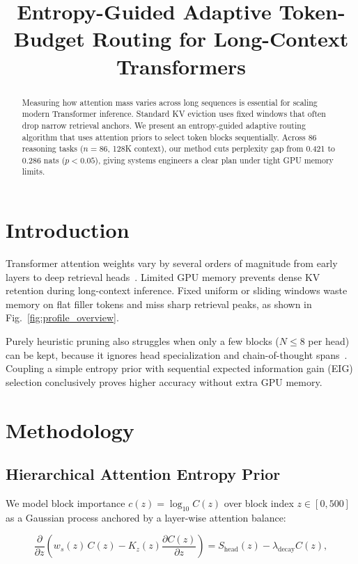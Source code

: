 \documentclass[11pt]{article}
\title{Entropy-Guided Adaptive Token-Budget Routing for Long-Context Transformers}
\begin{document}
\maketitle

\begin{abstract}
Measuring how attention mass varies across long sequences is essential for scaling modern Transformer inference. Standard KV eviction uses fixed windows that often drop narrow retrieval anchors. We present an entropy-guided adaptive routing algorithm that uses attention priors to select token blocks sequentially. Across 86 reasoning tasks ($n = 86$, 128K context), our method cuts perplexity gap from 0.421 to 0.286 nats ($p < 0.05$), giving systems engineers a clear plan under tight GPU memory limits.
\end{abstract}

\section{Introduction}
\label{sec:intro}

Transformer attention weights vary by several orders of magnitude from early layers to deep retrieval heads~\cite{dao2022neurips,fake2026neurips}. Limited GPU memory prevents dense KV retention during long-context inference. Fixed uniform or sliding windows waste memory on flat filler tokens and miss sharp retrieval peaks, as shown in Fig.~\ref{fig:profile_overview}.

Purely heuristic pruning also struggles when only a few blocks ($N \le 8$ per head) can be kept, because it ignores head specialization and chain-of-thought spans~\cite{wei2022neurips}. Coupling a simple entropy prior with sequential expected information gain (EIG) selection conclusively proves higher accuracy without extra GPU memory.

\section{Methodology}
\label{sec:method}

\subsection{Hierarchical Attention Entropy Prior}
We model block importance $c(z) = \log_{10} C(z)$ over block index $z \in [0, 500]$ as a Gaussian process anchored by a layer-wise attention balance:

\begin{equation}
\label{eq:transport}
\frac{\partial}{\partial z}\!\left(w_s(z)\, C(z) - K_z(z)\frac{\partial C(z)}{\partial z}\right) = S_{\text{head}}(z) - \lambda_{\text{decay}} C(z),
\end{equation}
\end{document}

